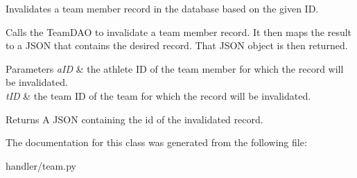 Invalidates a team member record in the database based on the given ID. 

Calls the Team\+D\+AO to invalidate a team member record. It then maps the result to a J\+S\+ON that contains the desired record. That J\+S\+ON object is then returned.


\begin{DoxyParams}{Parameters}
{\em a\+ID} & the athlete ID of the team member for which the record will be invalidated. \\
\hline
{\em t\+ID} & the team ID of the team for which the record will be invalidated.\\
\hline
\end{DoxyParams}
\begin{DoxyReturn}{Returns}
A J\+S\+ON containing the id of the invalidated record. 
\end{DoxyReturn}


The documentation for this class was generated from the following file\+:\begin{DoxyCompactItemize}
\item 
handler/team.\+py\end{DoxyCompactItemize}
